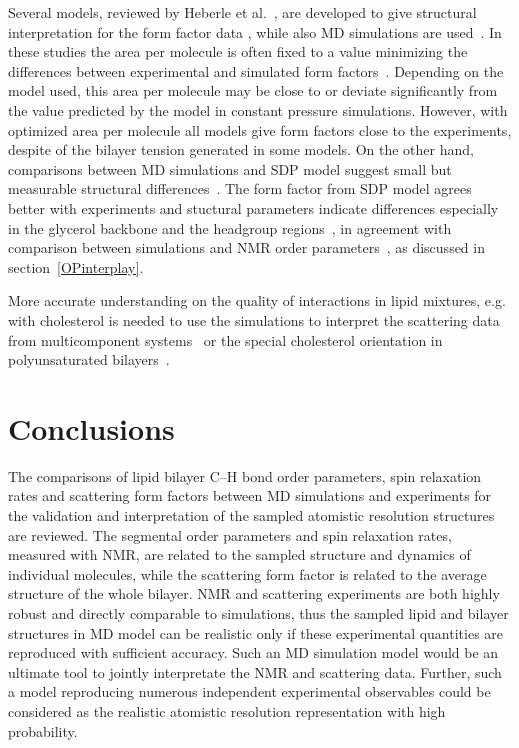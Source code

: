 \documentclass[aps,prl,superscriptaddress,twocolumn]{revtex4}
\begin{document}
Several models, reviewed by Heberle et al.~\cite{heberle12}, are developed to give structural interpretation 
for the form factor data \cite{fogarty15},  while also MD simulations are 
used~\cite{sachs03,klauda06,kucerka08a,kucerka08b,braun13}. In these studies the area per molecule 
is often fixed to a value minimizing the differences between experimental and simulated form 
factors~\cite{sachs03,klauda06,kucerka08a,kucerka08b,braun13}. Depending on the model used, this
area per molecule may be close to \cite{braun13} or deviate 
significantly \cite{sachs03,klauda06,kucerka08a,kucerka08b} from the value predicted 
by the model in constant pressure simulations. However, with optimized area per molecule all models give
form factors close to the experiments, despite of the bilayer tension generated in some models.
On the other hand, comparisons between MD simulations and SDP model suggest small but measurable 
structural differences~\cite{kucerka08a,braun13}. The form factor from SDP model agrees better
with experiments and stuctural parameters indicate differences especially in the 
glycerol backbone and the headgroup regions~\cite{kucerka08a,braun13}, 
in agreement with comparison between simulations and NMR order parameters~\cite{botan15}, 
as discussed in section~\ref{OPinterplay}.

More accurate understanding on the quality of interactions in lipid mixtures, e.g. with cholesterol is needed 
to use the simulations to interpret the scattering data from multicomponent systems~\cite{heftberger15} or the special
cholesterol orientation in polyunsaturated bilayers~\cite{harroun08,marrink07,kucerka10b}.



\section{Conclusions}

The comparisons of lipid bilayer C--H bond order parameters, spin relaxation rates and
scattering form factors between MD simulations and experiments for the validation and 
interpretation of the sampled atomistic resolution structures are reviewed.
The segmental order parameters and spin relaxation rates, measured with NMR, 
are related to the sampled structure and dynamics of individual molecules, while the
scattering form factor is related to the average structure of the whole bilayer.
NMR and scattering experiments are both highly robust and directly comparable to simulations, 
thus the sampled lipid and bilayer structures in MD model can be realistic only if these experimental 
quantities are reproduced with sufficient accuracy. Such an MD simulation model 
would be an ultimate tool to jointly interpretate the NMR and scattering data.
Further, such a model reproducing numerous independent experimental observables
could be  considered as the realistic atomistic resolution representation with high
probability. 
\end{document}

